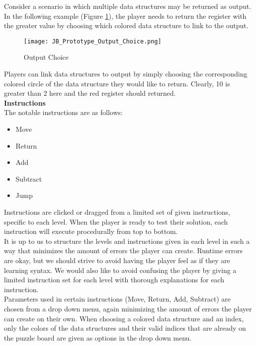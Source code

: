 Consider a scenario in which multiple data structures may be returned as output.
In the following example (Figure \ref{fig:Output_Choice}), the player needs to return the register
with the greater value by choosing which colored data structure to link to the output.\\

\begin{figure}[!hb]
	\caption{Output Choice}
	\label{fig:Output_Choice}
	\centering
	\texttt{[image: JB\_Prototype\_Output\_Choice.png]}
\end{figure}

Players can link data structures to output by simply choosing the corresponding colored
circle of the data structure they would like to return. Clearly, 10 is greater than 2 here and
the red register should returned.\\

\textbf{Instructions}\\
The notable instructions are as follows:
\begin{itemize}
	\item Move
	\item Return
	\item Add
	\item Subtract
	\item Jump
\end{itemize}

Instructions are clicked or dragged from a limited set of given instructions, 
specific to each level. When the player is ready to test their solution, each instruction will execute
procedurally from top to bottom.\\

It is up to us to structure the levels and instructions given in each level in such
a way that minimizes the amount of errors the player can create. Runtime errors
are okay, but we should strive to avoid having the player feel as if they are learning
syntax. We would also like to avoid confusing the player by giving a limited
instruction set for each level with thorough explanations for each instruction.\\

Parameters used in certain instructions (Move, Return, Add, Subtract) are chosen
from a drop down menu, again minimizing the amount of errors the player can create
on their own. When choosing a colored data structure and an index, only the colors of
the data structures and their valid indices that are already on the puzzle board
are given as options in the drop down menu.\\

